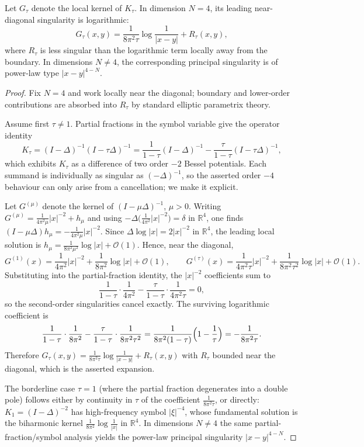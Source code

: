 \documentclass[10pt,a4paper]{amsart}
\begin{document}
\begin{lemma}
\label{lem:log-kernel-four-dim}
Let \(G_\tau\) denote the local kernel of \(K_\tau\).  In dimension \(N=4\), its
leading near-diagonal singularity is logarithmic:
\[
        G_\tau(x,y)
        =
        \frac{1}{8\pi^2\tau}\log\frac1{|x-y|}
        +
        R_\tau(x,y),
\]
where \(R_\tau\) is less singular than the logarithmic term locally away from
the boundary.  In dimensions \(N\ne4\), the corresponding principal singularity
is of power-law type \(|x-y|^{4-N}\).
\end{lemma}

\begin{proof}
Fix $N=4$ and work locally near the diagonal; boundary and lower-order
contributions are absorbed into $R_\tau$ by standard elliptic parametrix
theory.

Assume first $\tau\neq1$. Partial fractions in the symbol variable give the
operator identity
\[
   K_\tau=(I-\Delta)^{-1}(I-\tau\Delta)^{-1}
        =\frac{1}{1-\tau}(I-\Delta)^{-1}
         -\frac{\tau}{1-\tau}(I-\tau\Delta)^{-1},
\]
which exhibits $K_\tau$ as a difference of two order $-2$ Bessel
potentials. Each summand is individually as singular as $(-\Delta)^{-1}$, so
the asserted order $-4$ behaviour can only arise from a cancellation; we make
it explicit.

Let $G^{(\mu)}$ denote the kernel of $(I-\mu\Delta)^{-1}$, $\mu>0$. Writing
$G^{(\mu)}=\tfrac{1}{4\pi^2\mu}|x|^{-2}+h_\mu$ and using
$-\Delta\bigl(\tfrac{1}{4\pi^2}|x|^{-2}\bigr)=\delta$ in $\mathbb R^4$, one
finds $(I-\mu\Delta)h_\mu=-\tfrac{1}{4\pi^2\mu}|x|^{-2}$. Since
$\Delta\log|x|=2|x|^{-2}$ in $\mathbb R^4$, the leading local solution is
$h_\mu=\tfrac{1}{8\pi^2\mu^2}\log|x|+\mathcal O(1)$. Hence, near the diagonal,
\[
   G^{(1)}(x)=\frac{1}{4\pi^2}|x|^{-2}+\frac{1}{8\pi^2}\log|x|+\mathcal O(1),
   \qquad
   G^{(\tau)}(x)=\frac{1}{4\pi^2\tau}|x|^{-2}
                +\frac{1}{8\pi^2\tau^2}\log|x|+\mathcal O(1).
\]
Substituting into the partial-fraction identity, the $|x|^{-2}$ coefficients
sum to
\[
   \frac{1}{1-\tau}\cdot\frac{1}{4\pi^2}
   -\frac{\tau}{1-\tau}\cdot\frac{1}{4\pi^2\tau}=0,
\]
so the second-order singularities cancel exactly. The surviving logarithmic
coefficient is
\[
   \frac{1}{1-\tau}\cdot\frac{1}{8\pi^2}
   -\frac{\tau}{1-\tau}\cdot\frac{1}{8\pi^2\tau^2}
   =\frac{1}{8\pi^2(1-\tau)}\Bigl(1-\frac1\tau\Bigr)
   =-\frac{1}{8\pi^2\tau}.
\]
Therefore $G_\tau(x,y)=\tfrac{1}{8\pi^2\tau}\log\frac{1}{|x-y|}+R_\tau(x,y)$
with $R_\tau$ bounded near the diagonal, which is the asserted expansion.

The borderline case $\tau=1$ (where the partial fraction degenerates into a
double pole) follows either by continuity in $\tau$ of the coefficient
$\tfrac{1}{8\pi^2\tau}$, or directly: $K_1=(I-\Delta)^{-2}$ has high-frequency
symbol $|\xi|^{-4}$, whose fundamental solution is the biharmonic kernel
$\tfrac{1}{8\pi^2}\log\frac1{|x|}$ in $\mathbb R^4$. In dimensions $N\neq4$ the
same partial-fraction/symbol analysis yields the power-law principal
singularity $|x-y|^{4-N}$.
\end{proof}
\end{document}
